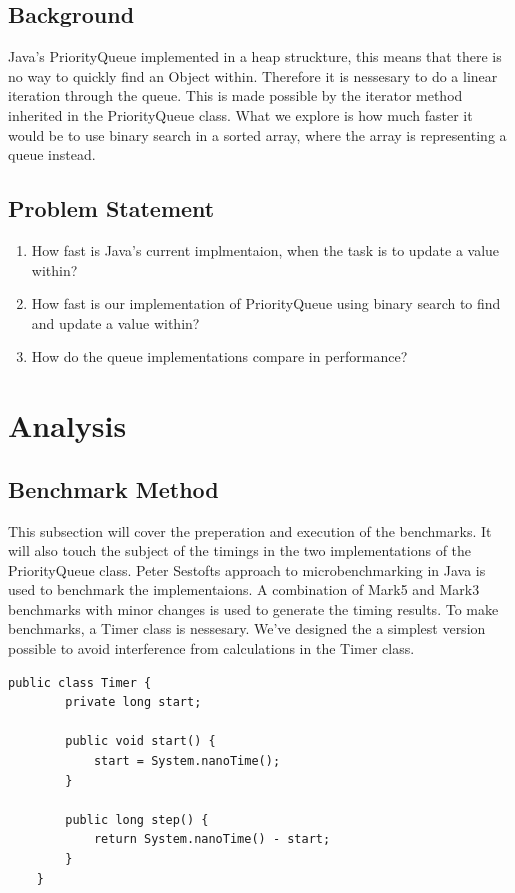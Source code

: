 \documentclass{article}
\begin{document}
\subsection{Background}
Java's PriorityQueue implemented in a heap struckture, this means that there is no way to quickly find an Object within.
Therefore it is nessesary to do a linear iteration through the queue. This is made possible by 
the iterator method inherited in the PriorityQueue class. What we explore is how much faster it would 
be to use binary search in a sorted array, where the array is representing a queue instead.  
\subsection{Problem Statement}
\begin{enumerate}
    \item How fast is Java's current implmentaion, when the task is to update a value within?
    \item How fast is our implementation of PriorityQueue using binary search to find and update a value within?
    \item How do the queue implementations compare in performance?
\end{enumerate}


\section{Analysis}
\subsection{Benchmark Method} %
This subsection will cover the preperation and execution of the benchmarks.
It will also touch the subject of the timings in the two implementations
of the PriorityQueue class. Peter Sestofts approach to microbenchmarking in 
Java \cite{microbenchmarks} is used to benchmark the implementaions. A combination of Mark5 and Mark3 
benchmarks with minor changes is used to generate the timing results. 
To make benchmarks, a Timer class is nessesary. We've designed the a simplest
version possible to avoid interference from calculations in the Timer class.

\begin{lstlisting}[caption={Simple Timer class implementation},label={lst:timerclass}]
    public class Timer {
        private long start;

        public void start() {
            start = System.nanoTime();
        }

        public long step() {
            return System.nanoTime() - start;
        }
    }
\end{lstlisting}
\end{document}

